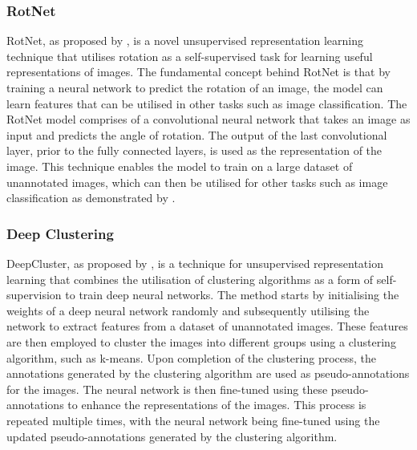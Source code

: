 \subsubsection{RotNet}
\label{subsubsec:RotNet}
RotNet, as proposed by \cite{gidaris2018unsupervised}, is a novel unsupervised representation learning technique that utilises rotation as a self-supervised task for learning useful representations of images. 
The fundamental concept behind RotNet is that by training a neural network to predict the rotation of an image, the model can learn features that can be utilised in other tasks such as image classification. The RotNet model comprises of a convolutional neural network that takes an image as input and predicts the angle of rotation. The output of the last convolutional layer, prior to the fully connected layers, is used as the representation of the image. This technique enables the model to train on a large dataset of unannotated images, which can then be utilised for other tasks such as image classification as demonstrated by \cite{zhou2021preservational}.

\subsubsection{Deep Clustering}
\label{subsubsec:deep_clustering}
DeepCluster, as proposed by \cite{caron2018deep}, is a technique for unsupervised representation learning that combines the utilisation of clustering algorithms as a form of self-supervision to train deep neural networks. The method starts by initialising the weights of a deep neural network randomly and subsequently utilising the network to extract features from a dataset of unannotated images. These features are then employed to cluster the images into different groups using a clustering algorithm, such as k-means. Upon completion of the clustering process, the annotations generated by the clustering algorithm are used as pseudo-annotations for the images. The neural network is then fine-tuned using these pseudo-annotations to enhance the representations of the images. This process is repeated multiple times, with the neural network being fine-tuned using the updated pseudo-annotations generated by the clustering algorithm.

